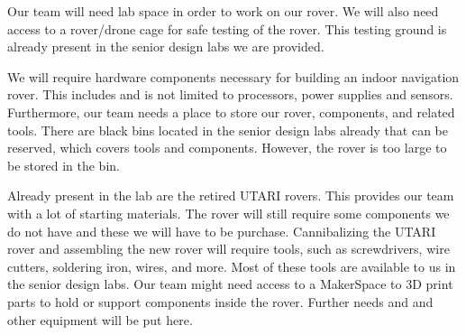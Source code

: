 Our team will need lab space in order to work on our rover. We will also need access to a rover/drone cage for safe testing of the rover. This testing ground is already present in the senior design labs we are provided.

We will require hardware components necessary for building an indoor navigation rover. This includes and is not limited to processors, power supplies and sensors. Furthermore, our team needs a place to store our rover, components, and related tools. There are black bins located in the senior design labs already that can be reserved, which covers tools and components. However, the rover is too large to be stored in the bin.

Already present in the lab are the retired UTARI rovers. This provides our team with a lot of starting materials. The rover will still require some components we do not have and these we will have to be purchase. Cannibalizing the UTARI rover and assembling the new rover will require tools, such as screwdrivers, wire cutters, soldering iron, wires, and more. Most of these tools are available to us in the senior design labs. Our team might need access to a MakerSpace to 3D print parts to hold or support components inside the rover. Further needs and and other equipment will be put here.

